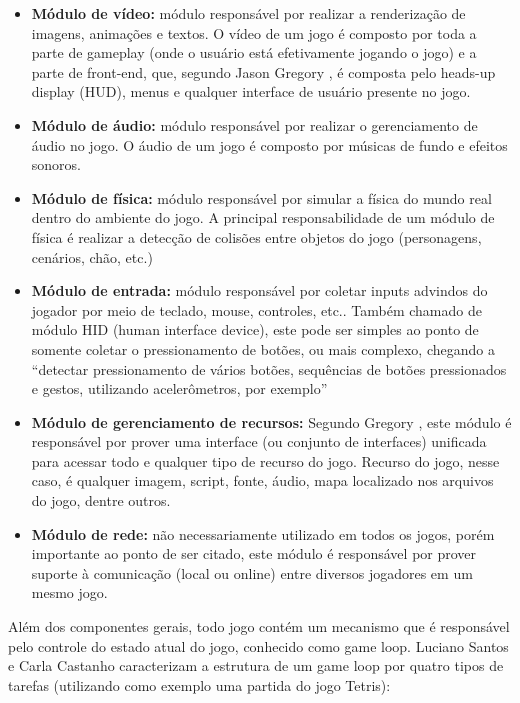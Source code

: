 \begin{itemize}
\item \textbf{Módulo de vídeo:} módulo responsável por realizar a renderização de imagens, animações e textos. O vídeo de um jogo é composto por toda a parte de gameplay (onde o usuário está efetivamente jogando o jogo) e a parte de front-end, que, segundo Jason Gregory \cite[p.~39]{gregory2014game}, é composta pelo heads-up display (HUD), menus e qualquer interface de usuário presente no jogo.

\item \textbf{Módulo de áudio:} módulo responsável por realizar o gerenciamento de áudio no jogo. O áudio de um jogo é composto por músicas de fundo e efeitos sonoros.

\item \textbf{Módulo de física:} módulo responsável por simular a física do mundo real dentro do ambiente do jogo. A principal responsabilidade de um módulo de física é realizar a detecção de colisões entre objetos do jogo (personagens, cenários, chão, etc.)

\item \textbf{Módulo de entrada:} módulo responsável por coletar inputs advindos do jogador por meio de teclado, mouse, controles, etc.. Também chamado de módulo HID (human interface device), este pode ser simples ao ponto de somente coletar o pressionamento de botões, ou mais complexo, chegando a “detectar pressionamento de vários botões, sequências de botões pressionados e gestos, utilizando acelerômetros, por exemplo” \cite[p.~43]{gregory2014game}

\item \textbf{Módulo de gerenciamento de recursos:} Segundo Gregory \cite[p.~35]{gregory2014game}, este módulo é responsável por prover uma interface (ou conjunto de interfaces) unificada para acessar todo e qualquer tipo de recurso do jogo. Recurso do jogo, nesse caso, é qualquer imagem, script, fonte, áudio, mapa localizado nos arquivos do jogo, dentre outros.

\item \textbf{Módulo de rede:} não necessariamente utilizado em todos os jogos, porém importante ao ponto de ser citado, este módulo é responsável por prover suporte à comunicação (local ou online) entre diversos jogadores em um mesmo jogo.
\end{itemize}


Além dos componentes gerais, todo jogo contém um mecanismo que é responsável pelo controle do estado atual do jogo, conhecido como game loop. Luciano Santos e Carla Castanho \cite{gameplayunb} caracterizam a estrutura de um game loop por quatro tipos de tarefas (utilizando como exemplo uma partida do jogo Tetris):

